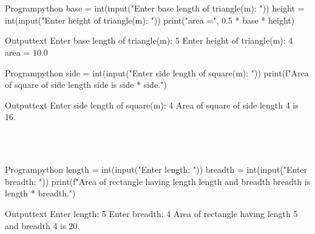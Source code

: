 \documentclass[11pt]{ipu-python}
\begin{document}
    \\~\\
    \begin{code}
        {Program}{python}
base = int(input("Enter base length of triangle(m): "))
height = int(input("Enter height of triangle(m): "))
print("area =", 0.5 * base * height)
    \end{code}
    \begin{code}
        {Output}{text}
Enter base length of triangle(m): 5
Enter height of triangle(m): 4
area = 10.0
    \end{code}
    \newpage

    \begin{code}
        {Program}{python}
side = int(input("Enter side length of square(m): "))
print(f"Area of square of side length {side} is {side * side}.")
    \end{code}
    \begin{code}
        {Output}{text}
Enter side length of square(m): 4
Area of square of side length 4 is 16.
    \end{code}

    \\~\\
    \begin{code}
        {Program}{python}
length = int(input("Enter length: "))
breadth = int(input("Enter breadth: "))
print(f"Area of rectangle having length {length} and breadth {breadth} is {length * breadth}.")
    \end{code}
    \begin{code}
        {Output}{text}
Enter length: 5
Enter breadth: 4
Area of rectangle having length 5 and breadth 4 is 20.
    \end{code}
\end{document}
